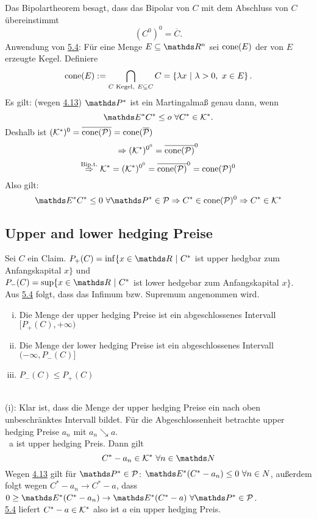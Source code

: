 Das Bipolartheorem besagt, dass das Bipolar von $C$ mit dem Abschluss von $C$ übereinstimmt
\[
(C^0)^0=\overline{C}.
\]
Anwendung von \hyperref[sub:satz_4fima]{5.4}:
Für eine Menge $E\subseteq \R^n$ sei $\operatorname{cone}(E)$ der von $E$ erzeugte Kegel.
Definiere
\[
\operatorname{cone}(E):= \bigcap\limits_{C\text{ Kegel},~E\subseteq C}C=\left\{\lambda x~|~ \lambda>0,~x\in E\right\}.
\]
Es gilt: (wegen \hyperref[sub:satz_2]{4.13}) $\Pw^*$ ist ein Martingalmaß genau dann, wenn
\[
\E^*C^*\le o~\forall C^*\in\mc{K}^*.
\]
Deshalb ist $(\mathcal{K}^*)^0=\overline{\operatorname{cone}(\mathcal{P})}=\operatorname{cone}(\overline{\mathcal{P}})$
\[
\Rightarrow (\mathcal{K}^*)^{0^0}=\overline{\operatorname{cone}(\mathcal{P})}^0
\]
\[
\stackrel{\text{Bip.t.}}{\Rightarrow} \mathcal{K}^*=(\mathcal{K^*})^{0^0}=\overline{\operatorname{cone}(\mathcal{P})}^0=\operatorname{cone}(\mathcal{P})^0
\]
Also gilt:
\[
\E^*C^*\le 0 ~\forall \Pw^*\in\mc{P}\Rightarrow C^*\in \cone(\mc{P})^0\Rightarrow C^*\in\mc{K}^*
\]

\subsection{Upper and lower hedging Preise}
\label{sub:upper_lower_preise}
Sei $C$ ein Claim.
$P_+(C)=\inf\{x\in \R~|~C^*$ ist upper hedgbar zum Anfangskapital $x\}$ und\\
$P_-(C)=\sup\{x\in \R~|~C^*$ ist lower hedgebar zum Anfangskapital $x \}$.\\
Aus \hyperref[sub:satz_4fima]{5.4} folgt, dass das Infimum bzw. Supremum angenommen wird.

\begin{enumerate}[(i)]
	\item Die Menge der upper hedging Preise ist ein abgeschlossenes Intervall $[P_+(C),+\infty)$
	\item Die Menge der lower hedging Preise ist ein abgeschlossenes Intervall $(-\infty,P_-(C)]$
	\item $P_-(C)\le P_+(C)$
\end{enumerate}

\\
(i): Klar ist, dass die Menge der upper hedging Preise ein nach oben unbeschränktes Intervall bildet.
Für die Abgeschlossenheit betrachte upper hedging Preise $a_n$ mit $a_n\searrow a$.\\
\zz~a ist upper hedging Preis.
Dann gilt 
\[
C^*-a_n\in \mc{K}^*~\forall n\in\N
\]
Wegen \hyperref[sub:satz_2]{4.13} gilt für $\Pw^*\in\mc{P}$: $\E^*(C^*-a_n)\le 0~\forall n\in N$, außerdem folgt wegen $C^*-a_n\to C^*-a$, dass $0\ge \E^*(C^*-a_n)\to \E^*(C^*-a) ~\forall \Pw^*\in \mc{P}$.\\
\hyperref[sub:satz_4fima]{5.4} liefert $C^*-a\in \mathcal{K}^*$ also ist $a$ ein upper hedging Preis.\\

